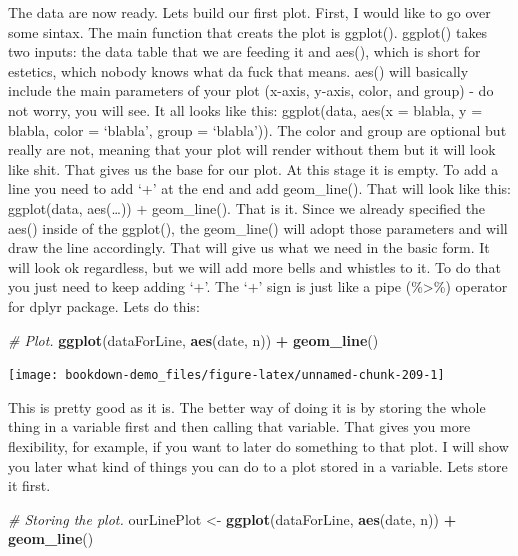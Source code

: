 \documentclass[]{book}
\newenvironment{Shaded}{\begin{snugshade}}{\end{snugshade}}
\newcommand{\CommentTok}[1]{\textcolor[rgb]{0.56,0.35,0.01}{\textit{#1}}}
\newcommand{\KeywordTok}[1]{\textcolor[rgb]{0.13,0.29,0.53}{\textbf{#1}}}
\newcommand{\NormalTok}[1]{#1}
\newcommand{\OperatorTok}[1]{\textcolor[rgb]{0.81,0.36,0.00}{\textbf{#1}}}
\newcommand{\StringTok}[1]{\textcolor[rgb]{0.31,0.60,0.02}{#1}}
\begin{document}
The data are now ready. Lets build our first plot. First, I would like to go over some sintax. The main function that creats the plot is ggplot(). ggplot() takes two inputs: the data table that we are feeding it and aes(), which is short for estetics, which nobody knows what da fuck that means. aes() will basically include the main parameters of your plot (x-axis, y-axis, color, and group) - do not worry, you will see.
It all looks like this: ggplot(data, aes(x = blabla, y = blabla, color = `blabla', group = `blabla')). The color and group are optional but really are not, meaning that your plot will render without them but it will look like shit. That gives us the base for our plot. At this stage it is empty. To add a line you need to add `+' at the end and add geom\_line(). That will look like this: ggplot(data, aes(\ldots{})) + geom\_line().
That is it. Since we already specified the aes() inside of the ggplot(), the geom\_line() will adopt those parameters and will draw the line accordingly. That will give us what we need in the basic form. It will look ok regardless, but we will add more bells and whistles to it. To do that you just need to keep adding `+'. The `+' sign is just like a pipe (\%\textgreater{}\%) operator for dplyr package. Lets do this:

\begin{Shaded}
\begin{Highlighting}[]
\CommentTok{# Plot.}
\KeywordTok{ggplot}\NormalTok{(dataForLine, }\KeywordTok{aes}\NormalTok{(date, n)) }\OperatorTok{+}
\StringTok{  }\KeywordTok{geom_line}\NormalTok{()}
\end{Highlighting}
\end{Shaded}

\begin{center}\texttt{[image: bookdown-demo\_files/figure-latex/unnamed-chunk-209-1]} \end{center}

This is pretty good as it is. The better way of doing it is by storing the whole thing in a variable first and then calling that variable. That gives you more flexibility, for example, if you want to later do something to that plot. I will show you later what kind of things you can do to a plot stored in a variable. Lets store it first.

\begin{Shaded}
\begin{Highlighting}[]
\CommentTok{# Storing the plot.}
\NormalTok{ourLinePlot <-}\StringTok{ }\KeywordTok{ggplot}\NormalTok{(dataForLine, }\KeywordTok{aes}\NormalTok{(date, n)) }\OperatorTok{+}
\StringTok{  }\KeywordTok{geom_line}\NormalTok{()}
\end{Highlighting}
\end{Shaded}
\end{document}
